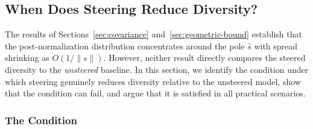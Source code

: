 %
%
%
%
%

\subsection{When Does Steering Reduce Diversity?}
\label{sec:conditions}

The results of Sections~\ref{sec:covariance} and~\ref{sec:geometric-bound}
establish that the post-normalization distribution concentrates around the
pole $\hat{s}$ with spread shrinking as $O(1/\|s\|)$.
However, neither result directly compares the steered diversity to the
\emph{unsteered} baseline.
In this section, we identify the condition under which steering genuinely
reduces diversity relative to the unsteered model, show that the condition
can fail, and argue that it is satisfied in all practical scenarios.

\subsubsection{The Condition}

